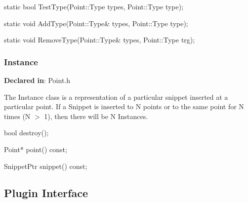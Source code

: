 \begin{apient}
static bool TestType(Point::Type types, Point::Type type);
\end{apient}



\begin{apient}
static void AddType(Point::Type& types, Point::Type type);
\end{apient}



\begin{apient}
static void RemoveType(Point::Type& types, Point::Type trg);
\end{apient}



\subsubsection{Instance}
\label{sec-3.1.3}

\textbf{Declared in}: Point.h

The Instance class is a representation of a particular snippet inserted at a
particular point. If a Snippet is inserted to N points or to the same point for
N times (N $>$ 1), then there will be N Instances.


\begin{apient}
bool destroy();
\end{apient}



\begin{apient}
Point* point() const;
\end{apient}



\begin{apient}
SnippetPtr snippet() const;
\end{apient}



\subsection{Plugin Interface}
\label{sec-3.2}

